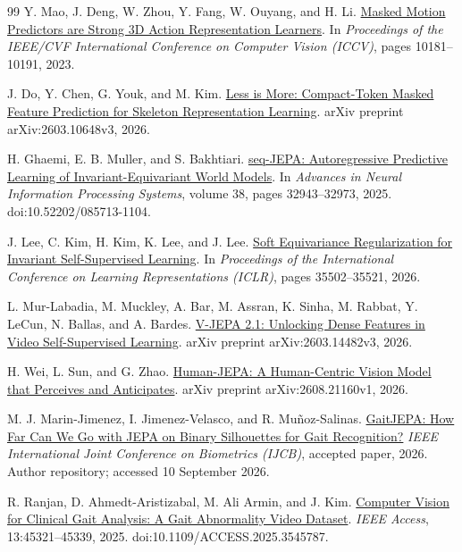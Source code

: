 \documentclass{article}
\begin{document}
{\begin{thebibliography}{99}
 Y. Mao, J. Deng, W. Zhou, Y. Fang, W. Ouyang, and H. Li. \href{https://arxiv.org/abs/2308.07092}{Masked Motion Predictors are Strong 3D Action Representation Learners}. In \emph{Proceedings of the IEEE/CVF International Conference on Computer Vision (ICCV)}, pages 10181--10191, 2023.

 J. Do, Y. Chen, G. Youk, and M. Kim. \href{https://arxiv.org/abs/2603.10648}{Less is More: Compact-Token Masked Feature Prediction for Skeleton Representation Learning}. arXiv preprint arXiv:2603.10648v3, 2026.

 H. Ghaemi, E. B. Muller, and S. Bakhtiari. \href{https://proceedings.neurips.cc/paper_files/paper/2025/hash/2f63d2963526bdd9ff1b8bcc2dc9905a-Abstract-Conference.html}{seq-JEPA: Autoregressive Predictive Learning of Invariant-Equivariant World Models}. In \emph{Advances in Neural Information Processing Systems}, volume 38, pages 32943--32973, 2025. doi:10.52202/085713-1104.

 J. Lee, C. Kim, H. Kim, K. Lee, and J. Lee. \href{https://proceedings.iclr.cc/paper_files/paper/2026/hash/3be6511c8f56d0dca4b5ed59fdf9b2f4-Abstract-Conference.html}{Soft Equivariance Regularization for Invariant Self-Supervised Learning}. In \emph{Proceedings of the International Conference on Learning Representations (ICLR)}, pages 35502--35521, 2026.

 L. Mur-Labadia, M. Muckley, A. Bar, M. Assran, K. Sinha, M. Rabbat, Y. LeCun, N. Ballas, and A. Bardes. \href{https://arxiv.org/abs/2603.14482}{V-JEPA 2.1: Unlocking Dense Features in Video Self-Supervised Learning}. arXiv preprint arXiv:2603.14482v3, 2026.

 H. Wei, L. Sun, and G. Zhao. \href{https://arxiv.org/abs/2608.21160}{Human-JEPA: A Human-Centric Vision Model that Perceives and Anticipates}. arXiv preprint arXiv:2608.21160v1, 2026.

 M. J. Marin-Jimenez, I. Jimenez-Velasco, and R. Muñoz-Salinas. \href{https://github.com/AVAuco/GaitJEPA}{GaitJEPA: How Far Can We Go with JEPA on Binary Silhouettes for Gait Recognition?} \emph{IEEE International Joint Conference on Biometrics (IJCB)}, accepted paper, 2026. Author repository; accessed 10 September 2026.

 R. Ranjan, D. Ahmedt-Aristizabal, M. Ali Armin, and J. Kim. \href{https://arxiv.org/abs/2407.04190}{Computer Vision for Clinical Gait Analysis: A Gait Abnormality Video Dataset}. \emph{IEEE Access}, 13:45321--45339, 2025. doi:10.1109/ACCESS.2025.3545787.


\end{thebibliography}}
\end{document}
